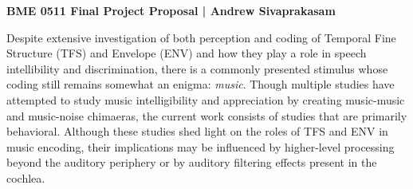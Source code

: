 \documentclass[9pt]{article}
\begin{document}
\begin{center}
{\Large \textbf{BME 0511 Final Project Proposal | Andrew Sivaprakasam}}
\end{center}

Despite extensive investigation of both perception and coding of Temporal Fine Structure (TFS) and Envelope (ENV) and how they play a role in speech intellibility and discrimination, there is a commonly presented stimulus whose coding still remains somewhat an enigma: \textit{music}. Though multiple studies have attempted to study music intelligibility and appreciation by creating music-music and music-noise chimaeras, the current work consists of studies that are primarily behavioral. Although these studies shed light on the roles of TFS and ENV in music encoding, their implications may be influenced by higher-level processing beyond the auditory periphery or by auditory filtering effects present in the cochlea.   

 
\end{document}
